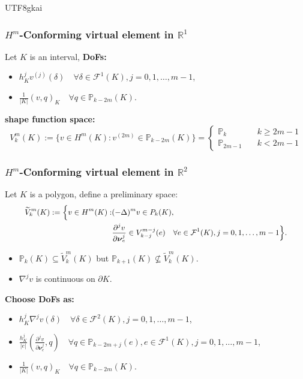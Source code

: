 \documentclass[notheorems,serif]{beamer}
\begin{document}
\begin{CJK}{UTF8}{gkai}
\begin{frame}
\frametitle{$H^m$-Conforming virtual element in $\mathbb{R}^1$}
Let $K$ is an interval, \bf{DoFs}:
\begin{itemize}
    \item $h_K^j v^{(j)}(\delta) \quad \forall \delta \in \mathcal{F}^1(K),
        j = 0, 1, \dots, m-1$,
    \item $\frac{1}{|K|}(v, q)_K \quad \forall q \in \mathbb{P}_{k-2m}(K)$. 
\end{itemize}
\bf{shape function space}:
$$
V_k^m(K) := \{v \in H^m(K): v^{(2m)}\in\mathbb{P}_{k-2m}(K)\} = 
\left\{ 
\begin{aligned}
    \mathbb{P}_{k} \quad & k\geq 2m-1\\
    \mathbb{P}_{2m-1} \quad & k < 2m-1
\end{aligned}
\right.
$$
\end{frame}

\begin{frame}
\frametitle{$H^m$-Conforming virtual element in $\mathbb{R}^2$}
Let $K$ is a polygon, define a preliminary space:
$$
\small{
\begin{aligned}
  \widetilde{V}_k^m(K) := \Big\{v \in H^m(K) : & (-\Delta)^m v \in P_k(K),\\ 
      & \frac{\partial^j v}{\partial \boldsymbol{\nu}_e^j} \in V_{k-j}^{m-j}(e) \quad 
    \forall e \in \mathcal{F}^1(K), j=0, 1, \dots, m-1\Big\}.
\end{aligned}
}
$$
\begin{itemize}
    \item $\mathbb{P}_k(K) \subseteq \widetilde{V}_k^m(K)$ but 
        $\mathbb{P}_{k+1}(K) \not\subseteq \widetilde{V}_k^m(K)$.
    \item $\nabla^j v$ is continuous on $\partial K$.
\end{itemize}

\bf{Choose DoFs as}:
\begin{itemize}
    \item $h_K^j \nabla^{j}v(\delta) \quad \forall \delta \in \mathcal{F}^2(K),
        j = 0, 1, \dots, m-1$,
    \item $\frac{h_K^j}{|e|}(\frac{\partial^j v}{\partial \boldsymbol{\nu}_e^j}, q) \quad 
        \forall q \in \mathbb{P}_{k-2m+j}(e), e \in \mathcal{F}^1(K), 
        j = 0, 1, \dots, m-1$,
    \item $\frac{1}{|K|}(v, q)_K \quad \forall q \in \mathbb{P}_{k-2m}(K)$. 
\end{itemize}
\end{frame}


\end{CJK}
\end{document}
